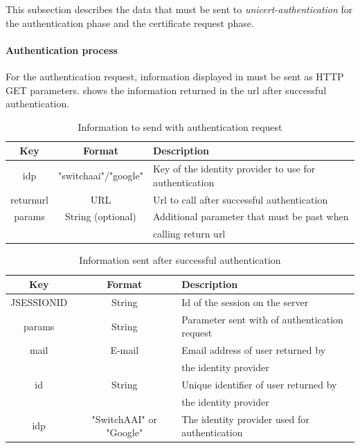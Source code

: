 \documentclass[oneside]{scrreprt}
\begin{document}
This subsection describes the data that must be sent to \textit{unicert-authentication} for the authentication phase and the certificate request phase.

\paragraph*{Authentication process}

For the authentication request, information displayed in  must be sent as HTTP GET parameters.  shows the information returned in the url after successful authentication.

\begin{table}[ht]
\centering
\begin{tabular}{|c|c|l|}
  \hline
  Key & Format & Description\\
  \hline
  idp & "switchaai"/"google" & Key of the identity provider to use for authentication\\
  returnurl & URL & Url to call after successful authentication\\
  params & String (optional) & Additional parameter that must be past when\\ & & calling return url\\
  \hline
\end{tabular}
\caption{Information to send with authentication request}
\label{t:authreq}
\end{table}

\begin{table}[ht]
\centering
\begin{tabular}{|c|c|l|}
  \hline
  Key & Format & Description\\
  \hline
  JSESSIONID & String & Id of the session on the server\\
  params & String & Parameter sent with of authentication request \\
  mail & E-mail & Email address of user returned by\\ & & the identity provider\\
  id & String & Unique identifier of user returned by\\ & & the identity provider\\
  idp & "SwitchAAI" or "Google" & The identity provider used for authentication\\
  \hline
\end{tabular}
\caption{Information sent after successful authentication}
\label{t:authresp}
\end{table}
\end{document}
